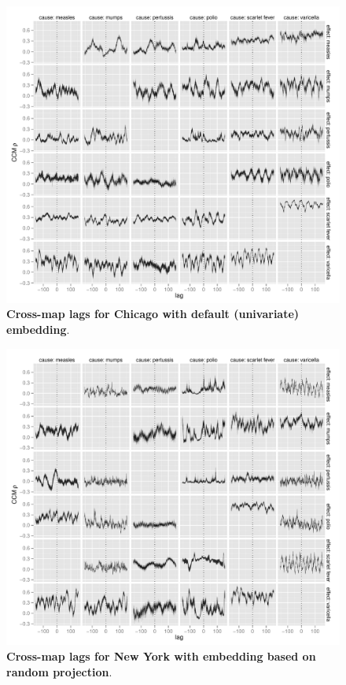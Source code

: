 \documentclass[10pt]{article}
\begin{document}
\begin{figure}
\begin{center}
  \includegraphics[width=5in]{dataflow/out/fig_cities_corrbylag/chi_self_uniform_plot.pdf}
  \end{center}
  \caption{\textbf{Cross-map lags for Chicago with default (univariate) embedding}.  \label{fig:chi_uni_tmp}}
\end{figure}

\begin{figure}
\begin{center}
  \includegraphics[width=5in]{dataflow/out/fig_cities_corrbylag/nyc_cross_projection_plot.pdf}
  \end{center}
  \caption{\textbf{Cross-map lags for New York with embedding based on random projection}.  \label{fig:nyc_rand_tmp}}
\end{figure}
\end{document}
